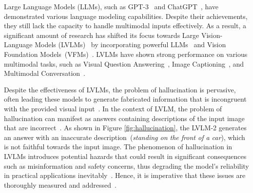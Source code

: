 Large Language Models (LLMs), such as GPT-3~\cite{gpt3} and ChatGPT~\cite{chatgpt}, have demonstrated various language modeling capabilities. Despite their achievements, they still lack the capacity to handle multimodal inputs effectively. As a result, a significant amount of research has shifted its focus towards Large Vision-Language Models (LVLMs)~\cite{llava,mPLUG-Owl,llava_rlhf}
by incorporating powerful LLMs~\cite{llama,vicuna} and Vision Foundation Models~(VFMs)~\cite{vit,DBLP:journals/corr/abs-2108-07258}. 
LVLMs have shown strong performance on various multimodal tasks, such as Visual Question Answering~\cite{vqatask}, Image Captioning~\cite{mscoco}, and Multimodal Conversation~\cite{llava}.  



Despite the effectiveness of LVLMs, the problem of hallucination is pervasive, often leading these models to generate fabricated information that is incongruent with the provided visual input~\cite{DBLP:conf/emnlp/RohrbachHBDS18,liu2023aligning,liu2023hallusionbench,DBLP:journals/corr/abs-2310-16045,chang2024unifiedhallucinationmitigationframework}. 
In the context of LVLM, the problem of hallucination can manifest as answers containing descriptions of the input image that are incorrect~\cite{Li2023EvaluatingOH}. 
As shown in Figure \ref{fig:hallucination}, the LVLM-2 generates an answer with an inaccurate description~(\ie \textit{standing on the front of a car}), which is not faithful towards the input image. The phenomenon of hallucination in LVLMs introduces potential hazards that could result in significant consequences such as misinformation and safety concerns, thus degrading the model's reliability in practical applications inevitably~\cite{DBLP:conf/chi/MacLeodBMC17}. Hence, it is imperative that these issues are thoroughly measured and addressed~\cite{ji2023survey}. 
% 



